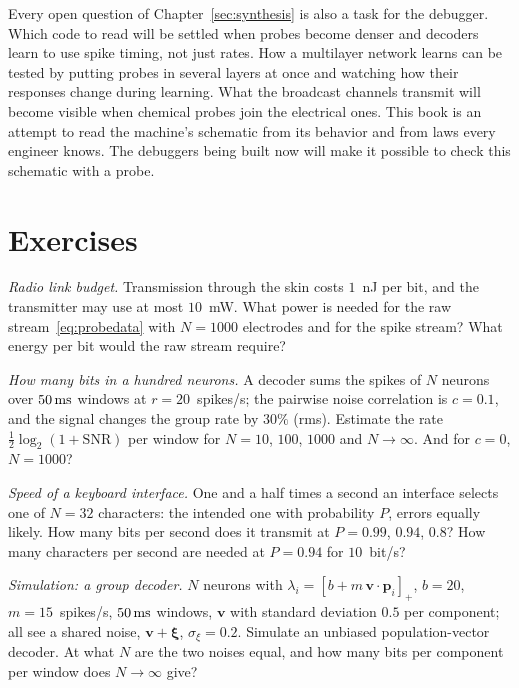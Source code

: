 Every open question of Chapter~\ref{sec:synthesis} is also a task for the debugger. Which code to read will be settled when probes become denser and decoders learn to use spike timing, not just rates. How a multilayer network learns can be tested by putting probes in several layers at once and watching how their responses change during learning. What the broadcast channels transmit will become visible when chemical probes join the electrical ones. This book is an attempt to read the machine's schematic from its behavior and from laws every engineer knows. The debuggers being built now will make it possible to check this schematic with a probe.

\section{Exercises}

\begin{exercise}[\lvlA]
\label{ex:17:1}
\emph{Radio link budget.} Transmission through the skin costs $1$~nJ per bit, and the transmitter may use at most $10$~mW. What power is needed for the raw stream~\eqref{eq:probedata} with $N=1000$ electrodes and for the spike stream? What energy per bit would the raw stream require?
\end{exercise}

\begin{exercise}[\lvlA]
\label{ex:17:2}
\emph{How many bits in a hundred neurons.} A decoder sums the spikes of $N$ neurons over $50\,\text{ms}$ windows at $r=20$~spikes/s; the pairwise noise correlation is $c=0.1$, and the signal changes the group rate by $30\%$ (rms). Estimate the rate $\tfrac12\log_2(1+\text{SNR})$ per window for $N=10$, $100$, $1000$ and $N\to\infty$. And for $c=0$, $N=1000$?
\end{exercise}

\begin{exercise}[\lvlB]
\label{ex:17:3}
\emph{Speed of a keyboard interface.} One and a half times a second an interface selects one of $N=32$ characters: the intended one with probability $P$, errors equally likely. How many bits per second does it transmit at $P=0.99$, $0.94$, $0.8$? How many characters per second are needed at $P=0.94$ for $10$~bit/s?
\end{exercise}

\begin{exercise}[\lvlB]
\label{ex:17:4}
\emph{Simulation: a group decoder.} $N$ neurons with $\lambda_i=[b+m\,\mathbf v\cdot\mathbf p_i]_+$, $b=20$, $m=15$~spikes/s, $50\,\text{ms}$ windows, $\mathbf v$ with standard deviation $0.5$ per component; all see a shared noise, $\mathbf v+\boldsymbol\xi$, $\sigma_\xi=0.2$. Simulate an unbiased population-vector decoder. At what $N$ are the two noises equal, and how many bits per component per window does $N\to\infty$ give?
\end{exercise}

